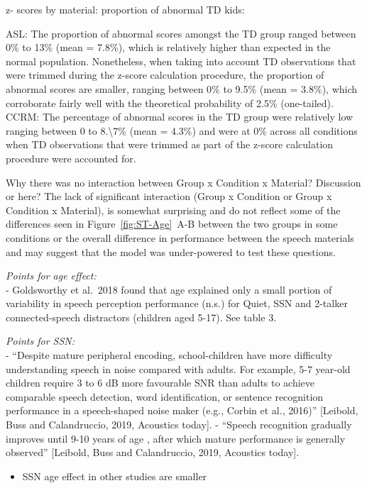 \documentclass[a4paper, twoside]{templates/ociamthesis}
\providecommand{\tightlist}{%
  \setlength{\itemsep}{0pt}\setlength{\parskip}{0pt}}
\begin{document}
z- scores by material:
proportion of abnormal TD kids:

ASL:
The proportion of abnormal scores amongst the TD group ranged between 0\% to 13\% (mean = 7.8\%), which is relatively higher than expected in the normal population. Nonetheless, when taking into account TD observations that were trimmed during the z-score calculation procedure, the proportion of abnormal scores are smaller, ranging between 0\% to 9.5\% (mean = 3.8\%), which corroborate fairly well with the theoretical probability of 2.5\% (one-tailed).\\

CCRM:
The percentage of abnormal scores in the TD group were relatively low ranging between 0 to 8.\textbackslash7\% (mean = 4.3\%) and were at 0\% across all conditions when TD observations that were trimmed as part of the z-score calculation procedure were accounted for.

Why there was no interaction between Group x Condition x Material?
\colorbox[HTML]{CCCCFF}{Discussion or here?} The lack of significant interaction (Group x Condition or Group x Condition x Material), is somewhat surprising and do not reflect some of the differences seen in Figure~\ref{fig:ST-Age}~A-B between the two groups in some conditions or the overall difference in performance between the speech materials and may suggest that the model was under-powered to test these questions.

\emph{Points for age effect:}\\
- Goldsworthy et al.~2018 found that age explained only a small portion of variability in speech perception performance (n.s.) for Quiet, SSN and 2-talker connected-speech distractors (children aged 5-17). See table 3.

\emph{Points for SSN:}\\
- ``Despite mature peripheral encoding, school-children have more difficulty understanding speech in noise compared with adults. For example, 5-7 year-old children require 3 to 6 dB more favourable SNR than adults to achieve comparable speech detection, word identification, or sentence recognition performance in a speech-shaped noise maker (e.g., Corbin et al., 2016)'' {[}Leibold, Buss and Calandruccio, 2019, Acoustics today{]}. - ``Speech recognition gradually improves until 9-10 years of age , after which mature performance is generally observed'' {[}Leibold, Buss and Calandruccio, 2019, Acoustics today{]}.

\begin{itemize}
\tightlist
\item
  SSN age effect in other studies are smaller
\end{itemize}
\end{document}
